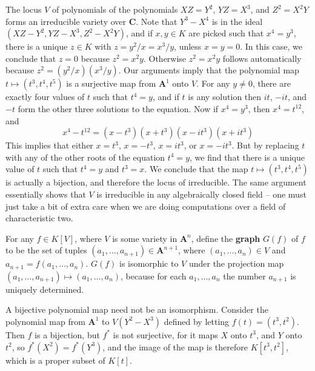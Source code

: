 \begin{example}
    The locus $V$ of polynomials of the polynomials $XZ = Y^2$, $YZ = X^3$, and $Z^2 = X^2Y$ forms an irreducible variety over $\mathbf{C}$. Note that $Y^3 - X^4$ is in the ideal $(XZ - Y^2, YZ - X^3, Z^2 - X^2Y)$, and if $x,y \in K$ are picked such that $x^4 = y^3$, there is a unique $z \in K$ with $z = y^2/x = x^3/y$, unless $x = y = 0$. In this case, we conclude that $z = 0$ because $z^2 = x^2y$. Otherwise $z^2 = x^2y$ follows automatically because $z^2 = (y^2/x)(x^3/y)$.  Our arguments imply that the polynomial map $t \mapsto (t^3,t^4,t^5)$ is a surjective map from $\mathbf{A}^1$ onto $V$. For any $y \neq 0$, there are exactly four values of $t$ such that $t^4 = y$, and if $t$ is any solution then $it$, $-it$, and $-t$ form the other three solutions to the equation. Now if $x^4 = y^3$, then $x^4 = t^{12}$, and
    \[ x^4 - t^{12} = (x - t^3)(x + t^3)(x - it^3)(x + it^3) \]
    This implies that either $x = t^3$, $x = -t^3$, $x = it^3$, or $x = -it^3$. But by replacing $t$ with any of the other roots of the equation $t^4 = y$, we find that there is a unique value of $t$ such that $t^4 = y$ and $t^3 = x$. We conclude that the map $t \mapsto (t^3,t^4,t^5)$ is actually a bijection, and therefore the locus of irreducible. The same argument essentially shows that $V$ is irreducible in any algebraically closed field -- one must just take a bit of extra care when we are doing computations over a field of characteristic two.
\end{example}

\begin{example}
    For any $f \in K[V]$, where $V$ is some variety in $\mathbf{A}^n$, define the {\bf graph} $G(f)$ of $f$ to be the set of tuples $(a_1, \dots, a_{n+1}) \in \mathbf{A}^{n+1}$, where $(a_1, \dots, a_n) \in V$ and $a_{n+1} = f(a_1, \dots, a_n)$. $G(f)$ is isomorphic to $V$ under the projection map $(a_1, \dots, a_{n+1}) \mapsto (a_1, \dots, a_n)$, because for each $a_1, \dots, a_n$ the number $a_{n+1}$ is uniquely determined.
\end{example}

\begin{example}
    A bijective polynomial map need not be an isomorphism. Consider the polynomial map from $\mathbf{A}^1$ to $V(Y^2-X^3)$ defined by letting $f(t) = (t^3,t^2)$. Then $f$ is a bijection, but $f^*$ is not surjective, for it maps $X$ onto $t^3$, and $Y$ onto $t^2$, so $f^*(X^2) = f^*(Y^3)$, and the image of the map is therefore $K[t^3,t^2]$, which is a proper subset of $K[t]$.
\end{example}

